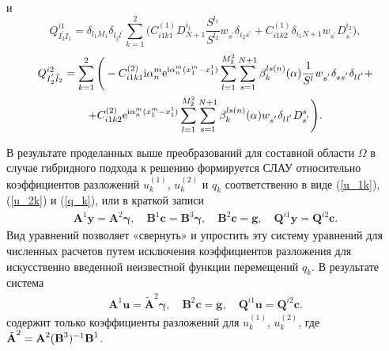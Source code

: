 \documentclass[press]{vestnik}
\begin{document}
и
\[
		Q_{I_{2}^{'}I_{1}^{}}^{i1} = \delta_{l_{1}^{} M_{1}^{}} \delta_{l_{2}^{} l_{}^{'}} \sum_{k=1}^{2} \Bigg(  C_{i1k1}^{(1)} D_{N+1}^{i_{1}^{}}  \frac{S^{l_{1}}}{S^{l_{2}}} w_{s^{'}}^{} \delta_{i_{2}^{} s_{}^{'}}  +  C_{i1k2}^{(1)} \delta_{i_{1}^{} N+1} w_{s^{'}}^{} D_{s^{'}}^{i_{2}^{}} \Bigg),
\]
\begin{multline*}
		Q_{I_{2}^{'}\tilde{I}_{2}}^{i2} = \sum_{k=1}^{2}
		\Bigg( -C_{i1k1}^{(2)} {\rm{i}} {\alpha_{n}^{m}} \mathrm{e}^{ {\rm{i}} {\alpha_{n}^{m}} (x_{1}^{m}-x_{1}^{1})} \sum_{l=1}^{M_{2}^{2}} \sum_{s=1}^{N+1} 		\beta_{k^{}}^{ls(n)}(\alpha) \frac{1}{S^{l}} w_{s^{'}}^{} \delta_{s_{}^{} s_{}^{'}} \delta_{l_{}^{} l_{}^{'}}  +
		\\
		+ C_{i1k2}^{(2)} \mathrm{e}^{ {\rm{i}} {\alpha_{n}^{m}} (x_{1}^{m}-x_{1}^{1})} \sum_{l=1}^{M_{2}^{2}} \sum_{s=1}^{N+1} \beta_{k^{}}^{ls(n)}(\alpha) w_{s^{'}}^{} \delta_{l_{}^{} l_{}^{'}} D_{s_{}^{'}}^{s} 
		\Bigg).
\end{multline*}

В результате  проделанных выше преобразований для составной области $\Omega$ в случае гибридного подхода к решению формируется СЛАУ относительно коэффициентов разложений  $u_{k}^{(1)}$, $u_{k}^{(2)}$ и $q_{k}$  соответственно в виде (\ref{u_1k}), (\ref{u_2k}) и (\ref{q_k}), или в краткой записи
\begin{equation*}
	\begin{gathered}
		\bm{A}^{1} \bm{y} = \bm{A}^{2} \bm{\gamma}, \quad
		\bm{B}^{1} \bm{c} = \bm{B}^{3} \bm{\gamma}, \quad
		\bm{B}^{2} \bm{c} = \bm{g}, \quad
		\bm{Q}^{i1} \bm{y} = \bm{Q}^{i2} \bm{c}.
	\end{gathered}
\end{equation*}
Вид уравнений позволяет «свернуть» и упростить эту систему уравнений для численных расчетов путем исключения коэффициентов разложения для искусственно введенной неизвестной функции перемещений $q_{k}$. В результате система 
\begin{equation*}
	\begin{gathered}
		\bm{A}^{1} \bm{u} = \tilde{\bm{A}}^{2} \bm{\gamma}, \quad
		\bm{B}^{2} \bm{c} = \bm{g}, \quad
		\bm{Q}^{i1} \bm{u} = \bm{Q}^{i2} \bm{c}.
	\end{gathered}
\end{equation*}
содержит только коэффициенты разложений для $u_{k}^{(1)}$, $u_{k}^{(2)}$, где $\tilde{\bm{A}}^{2} \dm = \bm{A}^{2} (\bm{B}^{3})^{-1} \bm{B}^{1}$.
\end{document}
